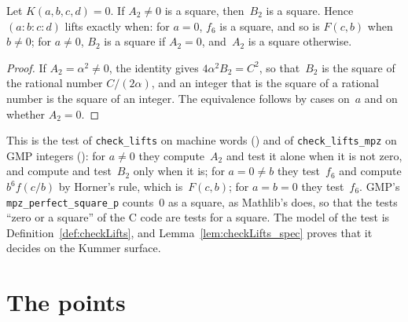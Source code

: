 \begin{lemma}\label{lem:lifts_iff_of_kummer_eq_zero}
  \leanok
  Let $K(a, b, c, d) = 0$. If $A_2 \ne 0$ is a square, then~$B_2$ is a square. Hence
  $(a : b : c : d)$ lifts exactly when: for $a = 0$, $f_6$ is a square, and so is $F(c, b)$ when
  $b \ne 0$; for $a \ne 0$, $B_2$ is a square if $A_2 = 0$, and~$A_2$ is a square otherwise.
\end{lemma}

\begin{proof}\leanok
  If $A_2 = \alpha^2 \ne 0$, the identity gives $4 \alpha^2 B_2 = C^2$, so that~$B_2$ is the square
  of the rational number $C/(2\alpha)$, and an integer that is the square of a rational number is
  the square of an integer. The equivalence follows by cases on~$a$ and on whether $A_2 = 0$.
\end{proof}

\begin{remark}\label{rem:specLiftsC}
  This is the test of \texttt{check\_lifts} on machine words () and
  of \texttt{check\_lifts\_mpz} on GMP integers (): for $a \ne 0$
  they compute~$A_2$ and test it alone when it is not zero, and compute and test~$B_2$ only when
  it is; for $a = 0 \ne b$ they test~$f_6$ and compute $b^6 f(c/b)$ by Horner's rule, which
  is~$F(c, b)$; for $a = b = 0$ they test~$f_6$. GMP's \texttt{mpz\_perfect\_square\_p} counts~$0$
  as a square, as Mathlib's  does, so that the tests ``zero or a square'' of the C
  code are tests for a square. The model of the test is Definition~\ref{def:checkLifts}, and
  Lemma~\ref{lem:checkLifts_spec} proves that it decides  on the Kummer
  surface.
\end{remark}

\section{The points}\label{sec:specPoints}

